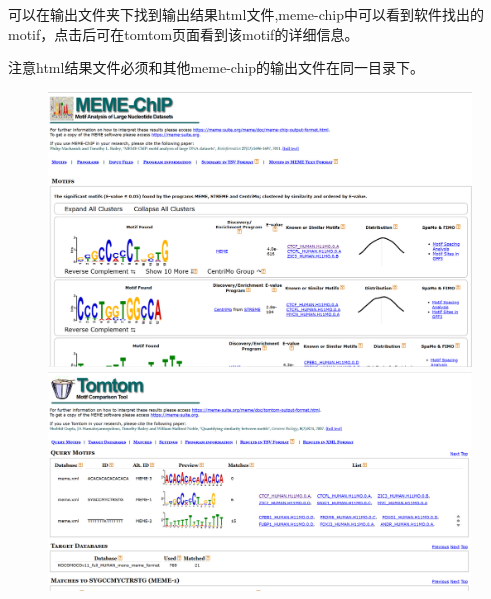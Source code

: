 可以在输出文件夹下找到输出结果html文件,meme-chip中可以看到软件找出的motif，点击后可在tomtom页面看到该motif的详细信息。\par
注意html结果文件必须和其他meme-chip的输出文件在同一目录下。
\begin{figure}[ht]
    \centering
    \begin{minipage}[c]{0.9\textwidth}
        \centering
        \includegraphics[width=13cm]{figure/memechip.png}
    \end{minipage}

    \begin{minipage}[c]{0.9\textwidth}
        \centering
        \includegraphics[width=13cm]{figure/tomtom.png}
    \end{minipage}
\end{figure}

